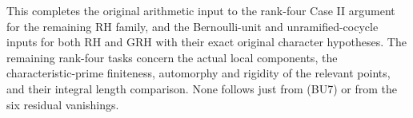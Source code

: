 This completes the original arithmetic input to the
rank-four Case II argument for the remaining RH family,
and the Bernoulli-unit and unramified-cocycle inputs for
both RH and GRH with their exact original character
hypotheses. The remaining rank-four tasks concern
the actual local components, the characteristic-prime
finiteness, automorphy and rigidity of the relevant
points, and their integral length comparison. None
follows just from (BU7) or from the six residual vanishings.
